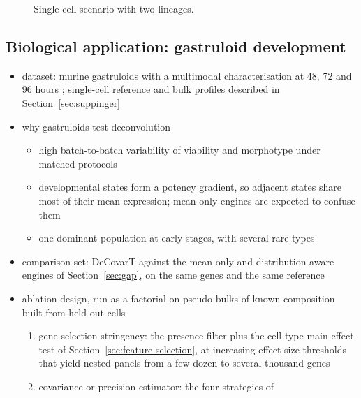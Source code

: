 \documentclass[pdflatex, sn-nature]{sn-jnl}
\theoremstyle{thmstyleone}%
\theoremstyle{thmstyletwo}%
\theoremstyle{thmstylethree}%
\begin{document}
\begin{figure}[ht]
  \centering
  \caption{Single-cell scenario with two lineages.
    }
  \label{fig:sc-hierarchical}
\end{figure}

\subsection{Biological application: gastruloid development}
\label{sec:gastruloid}

\begin{itemize}
  \item dataset: murine gastruloids with a multimodal characterisation at 48, 72 and 96 hours
        \cite{suppingerMultimodalCharacterizationMurine2023}; single-cell reference and bulk
        profiles described in Section~\ref{sec:suppinger}
  \item why gastruloids test deconvolution
  \begin{itemize}
    \item high batch-to-batch variability of viability and morphotype under matched protocols
    \item developmental states form a potency gradient, so adjacent states share most of their
          mean expression; mean-only engines are expected to confuse them
    \item one dominant population at early stages, with several rare types
  \end{itemize}
  \item comparison set: DeCovarT against the mean-only and distribution-aware engines of
        Section~\ref{sec:gap}, on the same genes and the same reference
  \item ablation design, run as a factorial on pseudo-bulks of known composition built from
        held-out cells
  \begin{enumerate}
    \item gene-selection stringency: the presence filter plus the cell-type main-effect test of
          Section~\ref{sec:feature-selection}, at increasing effect-size thresholds that yield
          nested panels from a few dozen to several thousand genes
    \item covariance or precision estimator: the four strategies of

\end{enumerate}
\end{itemize}
\end{document}
